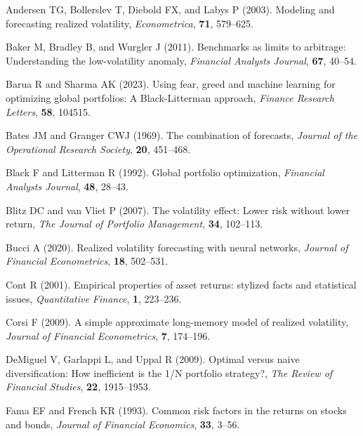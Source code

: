 \documentclass[eng]{kjas3}
\begin{document}
\begin{reference}
%
%
Andersen TG, Bollerslev T, Diebold FX, and Labys P (2003).
Modeling and forecasting realized volatility,
\textit{Econometrica}, \textbf{71}, 579--625.

Baker M, Bradley B, and Wurgler J (2011).
Benchmarks as limits to arbitrage: Understanding the low-volatility anomaly,
\textit{Financial Analysts Journal}, \textbf{67}, 40--54.

Barua R and Sharma AK (2023).
Using fear, greed and machine learning for optimizing global portfolios: A Black-Litterman approach,
\textit{Finance Research Letters}, \textbf{58}, 104515.

Bates JM and Granger CWJ (1969).
The combination of forecasts,
\textit{Journal of the Operational Research Society}, \textbf{20}, 451--468.

Black F and Litterman R (1992).
Global portfolio optimization,
\textit{Financial Analysts Journal}, \textbf{48}, 28--43.

Blitz DC and van Vliet P (2007).
The volatility effect: Lower risk without lower return,
\textit{The Journal of Portfolio Management}, \textbf{34}, 102--113.

Bucci A (2020).
Realized volatility forecasting with neural networks,
\textit{Journal of Financial Econometrics}, \textbf{18}, 502--531.

Cont R (2001).
Empirical properties of asset returns: stylized facts and statistical issues,
\textit{Quantitative Finance}, \textbf{1}, 223--236.

Corsi F (2009).
A simple approximate long-memory model of realized volatility,
\textit{Journal of Financial Econometrics}, \textbf{7}, 174--196.

DeMiguel V, Garlappi L, and Uppal R (2009).
Optimal versus naive diversification: How inefficient is the 1/N portfolio strategy?,
\textit{The Review of Financial Studies}, \textbf{22}, 1915--1953.

Fama EF and French KR (1993).
Common risk factors in the returns on stocks and bonds,
\textit{Journal of Financial Economics}, \textbf{33}, 3--56.


\end{reference}
\end{document}
